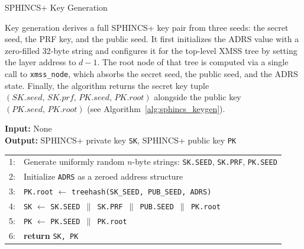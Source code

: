 \documentclass [version=submission]{iacrcc}
\begin{document}
\begin{subsection}{SPHINCS+ Key Generation}

Key generation derives a full SPHINCS+ key pair from three seeds: the secret seed, the PRF key, and the public seed. It first initializes the ADRS value with a zero‐filled 32‐byte string and configures it for the top-level XMSS tree by setting the layer address to \(d-1\). The root node of that tree is computed via a single call to \texttt{xmss\_node}, which absorbs the secret seed, the public seed, and the ADRS state. Finally, the algorithm returns the secret key tuple \((\mathit{SK}.\mathit{seed},\,\mathit{SK}.\mathit{prf},\,\mathit{PK}.\mathit{seed},\,\mathit{PK}.\mathit{root})\) alongside the public key \((\mathit{PK}.\mathit{seed},\,\mathit{PK}.\mathit{root})\) (see Algorithm~\ref{alg:sphincs_keygen}).

\begin{algorithm}
\caption{SPHINCS\_keyGen -- Generate a SPHINCS+ key pair}
\label{alg:sphincs_keygen}

\textbf{Input:} None \\
\textbf{Output:} SPHINCS+ private key \texttt{SK}, SPHINCS+ public key \texttt{PK}

\vspace{0.3cm}

\begin{tabular}{ll}
1: & Generate uniformly random $n$-byte strings: \texttt{SK.SEED}, \texttt{SK.PRF}, \texttt{PK.SEED} \\
2: & Initialize \texttt{ADRS} as a zeroed address structure \\
3: & \texttt{PK.root} $\leftarrow$ \texttt{treehash(SK\_SEED, PUB\_SEED, ADRS)} \\
4: & \texttt{SK} $\leftarrow$ \texttt{SK.SEED $\parallel$ SK.PRF $\parallel$ PUB.SEED $\parallel$ PK.root} \\
5: & \texttt{PK} $\leftarrow$ \texttt{PK.SEED $\parallel$ PK.root} \\
6: & \textbf{return} \texttt{SK, PK}
\end{tabular}
\end{algorithm}

\end{subsection}
\end{document}
